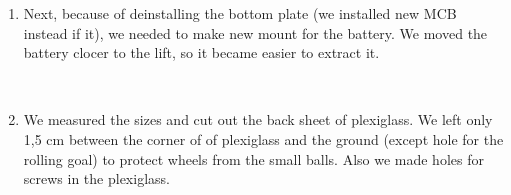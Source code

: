\begin{enumerate}
\begin{enumerate}
		\item Next, because of deinstalling the bottom plate (we installed new MCB instead if it), we needed to make new mount for the battery. We moved the battery clocer to the lift, so it became easier to extract it.
		\begin{figure}[H]
			\begin{minipage}[h]{0.2\linewidth}
				\center  
			\end{minipage}
			\begin{minipage}[h]{0.6\linewidth}
				\caption{}
			\end{minipage}
		\end{figure}
		
        \item We measured the sizes and cut out the back sheet of plexiglass. We left only 1,5 cm between the corner of of plexiglass and the ground (except hole for the rolling goal) to protect wheels from the small balls. Also we made holes for screws in the plexiglass.
        \begin{figure}[H]
        	\begin{minipage}[h]{0.2\linewidth}
        		\center  
        	\end{minipage}
        	\begin{minipage}[h]{0.6\linewidth}
        		\caption{}
        	\end{minipage}
        \end{figure}
        

\end{enumerate}
\end{enumerate}
